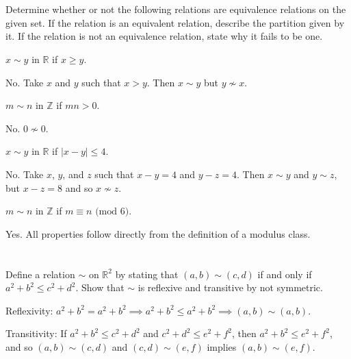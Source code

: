 \section{}\label{sec:1-25}

Determine whether or not the following relations are equivalence relations on the given set. If the relation is an equivalent relation, describe the partition given by it. If the relation is not an equivalence relation, state why it fails to be one.

\begin{exlist}
    \item $x \sim y$ in $\mathbb{R}$ if $x \geq y$.

    \smallskip

    No. Take $x$ and $y$ such that $x > y$. Then $x \sim y$ but $y \nsim x$.

    \item $m \sim n$ in $\mathbb{Z}$ if $mn > 0$.

    \smallskip

    No. $0 \nsim 0$.

    \item $x \sim y$ in $\mathbb{R}$ if $|x - y| \leq 4$.

    \smallskip

    No. Take $x$, $y$, and $z$ such that $x - y = 4$ and $y - z = 4$. Then $x \sim y$ and $y \sim z$, but $x - z = 8$ and so $x \nsim z$.

    \item $m \sim n$ in $\mathbb{Z}$ if $m \equiv n \text{ (mod 6)}$.

    \smallskip

    Yes. All properties follow directly from the definition of a modulus class.
\end{exlist}

\section{}\label{sec:1-26}

Define a relation $\sim$ on $\mathbb{R}^2$ by stating that $(a, b) \sim (c, d)$ if and only if $a^2 + b^2 \leq c^2 + d^2$. Show that $\sim$ is reflexive and transitive by not symmetric.
\hr

Reflexivity: $a^2 + b^2 = a^2 + b^2 \implies a^2 + b^2 \leq a^2 + b^2 \implies (a, b) \sim (a, b)$.

\smallskip

Transitivity: If $a^2 + b^2 \leq c^2 + d^2$ and $c^2 + d^2 \leq e^2 + f^2$, then $a^2 + b^2 \leq e^2 + f^2$, and so $(a, b) \sim (c, d)$ and $(c, d) \sim (e, f)$ implies $(a, b) \sim (e, f)$.

